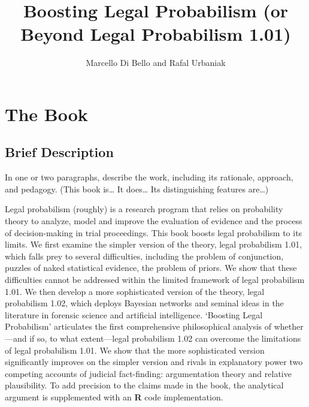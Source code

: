 \documentclass[10pt,dvipsnames,enabledeprecatedfontcommands]{scrartcl}
\title{Boosting Legal Probabilism (or Beyond Legal Probabilism 1.01)}
\author{Marcello Di Bello and Rafal Urbaniak}
\date{}
\begin{document}
\maketitle

\hypertarget{the-book}{%
\section{The Book}\label{the-book}}

\hypertarget{brief-description}{%
\subsection{Brief Description}\label{brief-description}}

\footnotesize In one or two paragraphs, describe the work, including its
rationale, approach, and pedagogy. (This book is\ldots{} It does\ldots{}
Its distinguishing features are\ldots{})

\normalsize

Legal probabilism (roughly) is a research program that relies on
probability theory to analyze, model and improve the evaluation of
evidence and the process of decision-making in trial proceedings. This
book boosts legal probabilism to its
limits. We
first examine the simpler version of the theory, legal probabilism 1.01,
which falls prey to several difficulties, including the problem of
conjunction, puzzles of naked statistical evidence, the problem of
priors. We show that these difficulties cannot be addressed within the
limited framework of legal probabilism 1.01. We then develop a more
sophisticated version of the theory, legal probabilism 1.02, which
deploys Bayesian networks and seminal ideas in the literature in
forensic science and artificial intelligence. `Boosting Legal
Probabilism' articulates the first comprehensive philosophical analysis
of whether---and if so, to what extent---legal probabilism 1.02 can
overcome the limitations of legal probabilism 1.01. We show that the
more sophisticated version significantly improves on the simpler version
and rivals in explanatory power two competing accounts of judicial
fact-finding: argumentation theory and relative plausibility. To add
precision to the claims made in the book, the analytical argument is
supplemented with an \textbf{\textsf{R}} code implementation.
\end{document}
